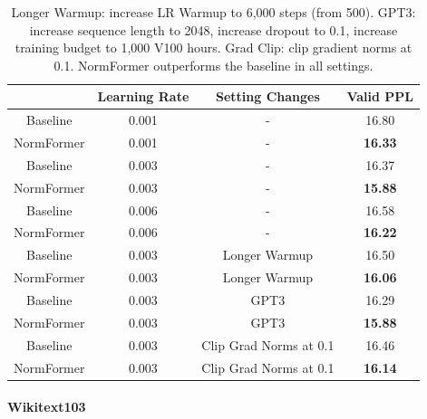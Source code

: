 \documentclass{article} %
\begin{document}
\begin{table}[!h]
\begin{center}
\begin{tabular}{@{}cccc@{}}
\toprule
          & Learning Rate & Setting Changes & Valid PPL      \\ \midrule
Baseline  & 0.001         &    -           & 16.80          \\
NormFormer & 0.001         &    -          & \textbf{16.33} \\ \midrule 
Baseline  & 0.003         &    -          & 16.37          \\ 
NormFormer & 0.003         &    -           & \textbf{15.88} \\ \midrule
Baseline  & 0.006         &   -              & 16.58          \\
NormFormer & 0.006         &   -            & \textbf{16.22} \\ \midrule
Baseline  & 0.003         & Longer Warmup          & 16.50          \\
NormFormer & 0.003         & Longer Warmup         & \textbf{16.06} \\ \midrule
Baseline  & 0.003         & GPT3          & 16.29          \\
NormFormer & 0.003         & GPT3          & \textbf{15.88} \\\midrule
Baseline  & 0.003         & Clip Grad Norms at 0.1          & 16.46          \\
NormFormer & 0.003         & Clip Grad Norms at 0.1          & \textbf{16.14} \\ \bottomrule
\end{tabular}
\caption{Longer Warmup: increase LR Warmup to 6,000 steps (from 500). GPT3: increase sequence length to 2048, increase dropout to 0.1, increase training budget to 1,000 V100 hours. Grad Clip: clip gradient norms at 0.1. NormFormer outperforms the baseline in all settings.}
\label{tab:hparam_results}
\end{center}
\end{table}

\paragraph{Wikitext103}
\label{wikitext}
\end{document}

